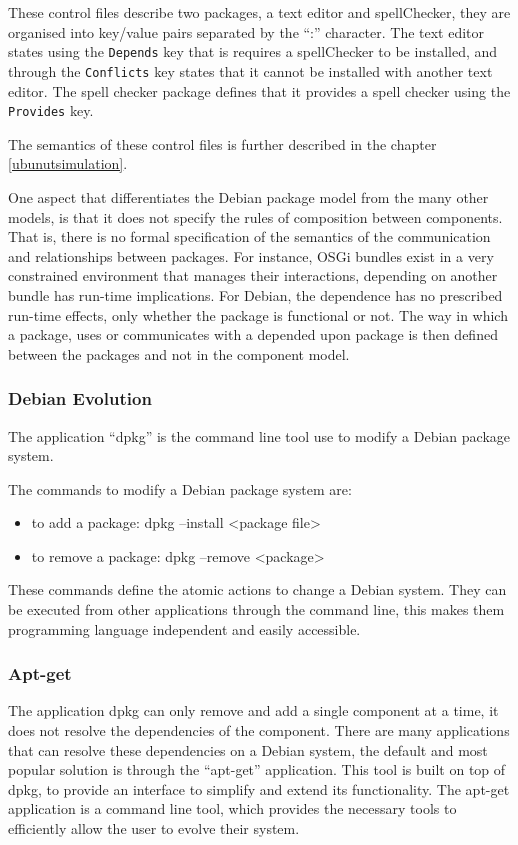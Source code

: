 These control files describe two packages, a text editor and spellChecker, they are organised into key/value pairs separated by the ``:'' character.
The text editor states using the \verb+Depends+ key that is requires a spellChecker to be installed, 
and through the \verb+Conflicts+ key states that it cannot be installed with another text editor.
The spell checker package defines that it provides a spell checker  using the \verb+Provides+ key.

The semantics of these control files is further described in the chapter \ref{ubunutsimulation}.

One aspect that differentiates the Debian package model from the many other models, is that it does not specify the rules of composition between components.
That is, there is no formal specification of the semantics of the communication and relationships between packages.
For instance, OSGi bundles exist in a very constrained environment that manages their interactions, depending on another bundle has run-time implications.
For Debian, the dependence has no prescribed run-time effects, only whether the package is functional or not.
The way in which a package, uses or communicates with a depended upon package is then defined between the packages and not in the component model.

\subsubsection{Debian Evolution}
The application ``dpkg'' is the command line tool use to modify a Debian package system.

The commands to modify a Debian package system are:
\begin{itemize}
  \item to add a package: dpkg --install <package file>
  \item to remove a package: dpkg --remove <package>
\end{itemize}

These commands define the atomic actions to change a Debian system.
They can be executed from other applications through the command line, this makes them programming language independent and easily accessible. 

\subsubsection{Apt-get}
The application dpkg can only remove and add a single component at a time, it does not resolve the dependencies of the component.
There are many applications that can resolve these dependencies on a Debian system, the default and most popular solution is through the ``apt-get'' application.
This tool is built on top of dpkg, to provide an interface to simplify and extend its functionality.
The apt-get application is a command line tool, which provides the necessary tools to efficiently allow the user to evolve their system.


